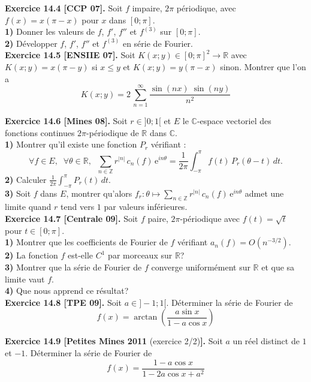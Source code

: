 \documentclass[a4paper,12pt,francais]{article}
\newcommand{\field}[1]{\mathbb{#1}}
\newcommand{\Z}{\field{Z}}
\newcommand{\R}{\field{R}}
\newcommand{\C}{\field{C}}
\newcommand{\e}{\mbox{e}}
\begin{document}
\noindent
{\bf Exercice 14.4 [CCP 07].} Soit $f$ impaire, $2\pi$ périodique, avec $f(x)=x(\pi-x)$ pour $x$ dans $[0;\pi]$.\\
\indent
{\bf 1)} Donner les valeurs de $f$, $f'$, $f''$ et $f^{(3)}$ sur $[0;\pi]$.\\
\indent
{\bf 2)} Développer $f$, $f'$, $f''$ et $f^{(3)}$ en série de Fourier.\\
  
\noindent
{\bf Exercice 14.5 [ENSIIE 07].} Soit $K(x;y) \in [0;\pi]^2 \to \R$ avec $K(x;y)=x(\pi-y)$ si $x\leqslant y$ et $K(x;y)=y(\pi-x)$ sinon. Montrer que l'on a 
$$K(x;y)=2 \, \sum_{n=1}^\infty \frac{\sin(nx)\; \sin(ny) }{n^2} $$

\noindent
{\bf Exercice 14.6 [Mines 08].} Soit $r\in ]0;1[$ et $E$ le $\C$-espace vectoriel des fonctions continues $2\pi$-périodique de $\R$ dans $\C$.\\
{\bf 1)}
Montrer qu'il existe une fonction $P_r$ vérifiant : 
$$\displaystyle \forall f \in E,\; \; \forall \theta \in \R,\; \; \sum_{n\in \Z} r^{|n|} \, c_n(f)\, \e^{in\theta}=\frac{1}{2\pi} \int_{-\pi}^{\pi} f(t) \, P_r(\theta-t) \, dt.$$
{\bf 2)} Calculer $\displaystyle \frac{1}{2\pi} \int_{-\pi}^{\pi} P_r(t) \, dt.$\\
{\bf 3)} Soit $f$ dans $E$, montrer qu'alors $\displaystyle f_r:\theta \mapsto \sum_{n\in \Z} r^{|n|} \, c_n(f)\, \e^{in\theta}$ admet une limite quand $r$ tend vers $1$ par valeurs inférieures.\\

\noindent
{\bf Exercice 14.7 [Centrale 09].} Soit $f$ paire, $2\pi$-périodique avec $f(t)=\sqrt{t}$ pour $t\in [0;\pi]$.\\
{\bf 1)} Montrer que les coefficients de Fourier de $f$ vérifiant $a_n(f)=O(n^{-3/2})$.\\
{\bf 2)} La fonction $f$ est-elle $C^1$ par morceaux sur $\R$? \\
{\bf 3)} Montrer que la série de Fourier de $f$ converge uniformément sur $\R$ et que sa limite vaut $f$.\\
{\bf 4)} Que nous apprend ce résultat?\\

\noindent
{\bf Exercice 14.8 [TPE 09].} Soit $a\in ]-1;1[$. Déterminer la série de Fourier de 
$$f(x)=\arctan \left( \frac{a \sin x}{1-a \cos x} \right)$$

\noindent
{\bf Exercice 14.9 [Petites Mines 2011} (exercice 2/2){\bf ].} Soit $a$ un réel distinct de $1$ et $-1$. Déterminer la série de Fourier de 
$$f(x)=\frac{1-a \cos x}{1-2a \cos x + a^2}$$\\
\end{document}
